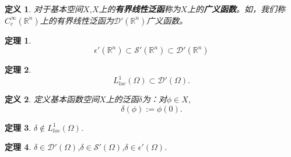 \documentclass[a4paper]{ctexart}
\newtheorem{Definition}{\hspace{2em}定义}[section]
\newtheorem{Thm}{\hspace{2em}定理}[section]
\begin{document}
\begin{Definition}
    对于基本空间$X$,$X$上的\textbf{有界线性泛函}称为$X$上的\textbf{广义函数}。如，我们称$C_{c}^{\infty}(\mathbb{R}^{n})$上的有界线性泛函为$\mathcal{D}'(\mathbb{R}^{n})$广义函数。
\end{Definition}
\begin{Thm}
    \begin{equation}
        \mathcal{\epsilon}'(\mathbb{R}^{n})\subset\mathscr{S}'(\mathbb{R}^{n})\subset\mathcal{D}'(\mathbb{R}^{n})
    \end{equation}
\end{Thm}
\begin{Thm}
    \begin{equation}
    L_{loc}^{1}(\Omega)\subset\mathcal{D}'(\Omega).
    \end{equation}
\end{Thm}
\begin{Definition}
    定义基本函数空间$X$上的泛函$\delta$为：对$\phi\in X$,
    \begin{equation}
        \delta(\phi):=\phi(0).
    \end{equation}
\end{Definition}
\begin{Thm}
    $\delta\notin L_{loc}^{1}(\Omega)$.
\end{Thm}
\begin{Thm}
    $\delta\in\mathcal{D}'(\Omega)$,$\delta\in\mathscr{S}'(\Omega)$,$\delta\in\epsilon'(\Omega)$.
\end{Thm}
\end{document}
